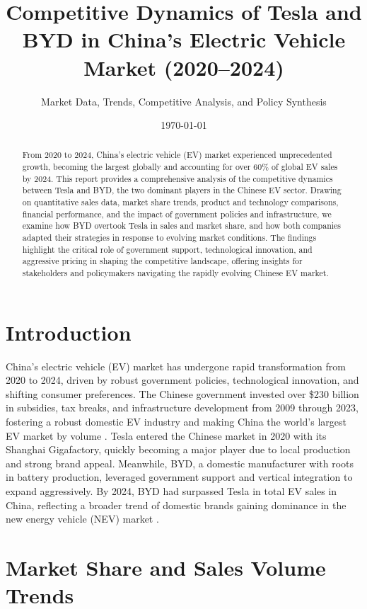 \documentclass{article}
\title{Competitive Dynamics of Tesla and BYD in China's Electric Vehicle Market (2020--2024)}
\author{Market Data, Trends, Competitive Analysis, and Policy Synthesis}
\date{\today}
\begin{document}
\maketitle

\begin{abstract}
From 2020 to 2024, China's electric vehicle (EV) market experienced unprecedented growth, becoming the largest globally and accounting for over 60\% of global EV sales by 2024. This report provides a comprehensive analysis of the competitive dynamics between Tesla and BYD, the two dominant players in the Chinese EV sector. Drawing on quantitative sales data, market share trends, product and technology comparisons, financial performance, and the impact of government policies and infrastructure, we examine how BYD overtook Tesla in sales and market share, and how both companies adapted their strategies in response to evolving market conditions. The findings highlight the critical role of government support, technological innovation, and aggressive pricing in shaping the competitive landscape, offering insights for stakeholders and policymakers navigating the rapidly evolving Chinese EV market.
\end{abstract}

\section{Introduction}

China's electric vehicle (EV) market has undergone rapid transformation from 2020 to 2024, driven by robust government policies, technological innovation, and shifting consumer preferences. The Chinese government invested over \$230 billion in subsidies, tax breaks, and infrastructure development from 2009 through 2023, fostering a robust domestic EV industry and making China the world's largest EV market by volume \citep{techreview2023,csis2024}. Tesla entered the Chinese market in 2020 with its Shanghai Gigafactory, quickly becoming a major player due to local production and strong brand appeal. Meanwhile, BYD, a domestic manufacturer with roots in battery production, leveraged government support and vertical integration to expand aggressively. By 2024, BYD had surpassed Tesla in total EV sales in China, reflecting a broader trend of domestic brands gaining dominance in the new energy vehicle (NEV) market \citep{sciencedirect2023,reuters2025}.

\section{Market Share and Sales Volume Trends}
\end{document}
